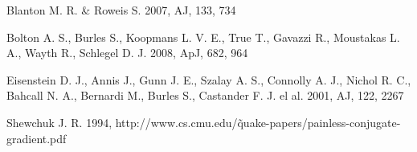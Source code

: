 \documentclass[apj]{emulateapj}
\begin{document}
\begin{thebibliography}{}
Blanton M. R. \& Roweis S. 2007, AJ, 133, 734

Bolton A. S., Burles S., Koopmans L. V. E., True T., Gavazzi R., Moustakas L. A., Wayth R., Schlegel D. J. 2008, ApJ, 682, 964

Eisenstein D. J., Annis J., Gunn J. E., Szalay A. S., Connolly A. J., Nichol R. C., Bahcall N. A., Bernardi M., Burles S., Castander F. J. el al. 2001, AJ, 122, 2267

Shewchuk J. R. 1994, http://www.cs.cmu.edu/\~quake-papers/painless-conjugate-gradient.pdf
\end{thebibliography}{}
\end{document}
